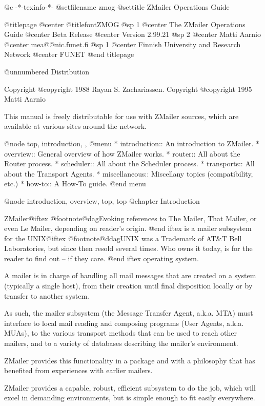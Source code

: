    @c -*-texinfo-*-
@setfilename zmog
@settitle ZMailer Operations Guide

@titlepage
@center @titlefont{ZMOG}
@sp 1
@center The ZMailer Operations Guide
@center Beta Release
@center Version 2.99.21
@sp 2
@center Matti Aarnio
@center mea@@nic.funet.fi
@sp 1
@center Finnish University and Research Network
@center FUNET
@end titlepage

@unnumbered Distribution

Copyright @copyright{} 1988 Rayan S. Zachariassen.
Copyright @copyright{} 1995 Matti Aarnio

This manual is freely distributable for use with ZMailer sources,
which are available at various sites around the network.

@node top, introduction, ,
@menu
* introduction::    An introduction to ZMailer.
* overview::        General overview of how ZMailer works.
* router::          All about the Router process.
* scheduler::       All about the Scheduler process.
* transports::      All about the Transport Agents.
* miscellaneous::   Miscellany topics (compatibility, etc.)
* how-to::          A How-To guide.
@end menu

@node introduction, overview, top, top
@chapter Introduction

ZMailer@iftex
@footnote{@dag}{Evoking references to The Mailer, That Mailer,
or even Le Mailer, depending on reader's origin.}
@end iftex
is a mailer subsystem for the UNIX@iftex
@footnote{@ddag}{UNIX was a Trademark of AT&T Bell Laboratories,
but since then resold several times. Who owns it today, is for
the reader to find out -- if they care.}
@end iftex
operating system.

A mailer is in charge of handling all mail messages that
are created on a system (typically a single host), from
their creation until final disposition locally or by transfer
to another system.

As such, the mailer subsystem (the Message Transfer Agent, a.k.a. MTA)
must interface to local mail reading and composing programs
(User Agents, a.k.a. MUAs), to the various transport methods
that can be used to reach other mailers, and to a variety of
databases describing the mailer's environment.

ZMailer provides this functionality in a package and with a philosophy
that has benefited from experiences with earlier mailers.

ZMailer provides a capable, robust, efficient subsystem to do the job,
which will excel in demanding environments, but is simple enough to fit
easily everywhere.

